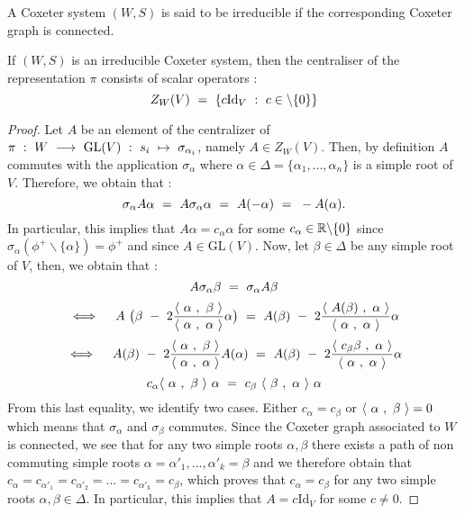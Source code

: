 \begin{definition}
	A Coxeter system $(W,S)$ is said to be irreducible if the corresponding Coxeter graph is connected.
\end{definition}
\begin{lemma}
	If $(W,S)$ is an irreducible Coxeter system, then the centraliser of the representation $\pi$ consists of scalar operators :
	\begin{equation}
	Z_W(V)\text{ }=\text{ }\{c\mbox{Id}_V\text{ }:\text{ } c\in \backslash\{0\}\}
	\end{equation}
\end{lemma}
\begin{proof}
	Let $A$ be an element of the centralizer of $\pi\text{ }:\text{ } W\text{ }\longrightarrow\text{ } \mbox{GL}(V)\text{ } :\text{ } s_i\text{ } \mapsto\text{ } \sigma_{\alpha_i}$, namely $A\in Z_W(V)$. Then, by definition $A$ commutes with the application $\sigma_\alpha$ where $\alpha\in \Delta=\{\alpha_1,...,\alpha_n\}$ is a simple root of $V$. Therefore, we obtain that :
	\begin{equation}
	\sigma_\alpha A\alpha\text{ }=\text{ } A\sigma_\alpha\alpha\text{ }=\text{ } A(-\alpha) \text{ }=\text{ } -A(\alpha).
	\end{equation}
	In particular, this implies that $A\alpha=c_\alpha\alpha$ for some $c_\alpha\in \mathbb R\backslash\{0\}$ since $\sigma_\alpha(\phi^+\backslash\{\alpha\})=\phi^+$ and since $A\in \mbox{GL}(V)$. Now, let $\beta\in\Delta$ be any simple root of $V$, then, we obtain that :
	\begin{equation*}
	A\sigma_\alpha\beta\text{ }=\text{ } \sigma_\alpha A\beta
	\end{equation*}
	\begin{equation*}
	\iff \quad A\text{ } \big(\beta\text{ }-\text{ } 2\frac{\langle\text{ } \alpha\text{ },\text{ }\beta\text{ }\rangle}{\langle\text{ } \alpha\text{ },\text{ }\alpha\text{ }\rangle}\alpha\big)\text{ }=\text{ } A(\beta)\text{ } -\text{ } 2\frac{\langle\text{ } A(\beta)\text{ },\text{ }\alpha\text{ }\rangle}{\langle\text{ } \alpha\text{ },\text{ }\alpha\text{ }\rangle}\alpha
	\end{equation*}
	\begin{equation*}
	\iff \quad A(\beta)\text{ }-\text{ } 2\frac{\langle\text{ } \alpha\text{ },\text{ }\beta\text{ }\rangle}{\langle\text{ } \alpha\text{ },\text{ }\alpha\text{ }\rangle}A(\alpha)\text{ }=\text{ } A(\beta)\text{ } -\text{ } 2\frac{\langle\text{ } c_\beta\beta\text{ },\text{ }\alpha\text{ }\rangle}{\langle\text{ } \alpha\text{ },\text{ }\alpha\text{ }\rangle}\alpha
	\end{equation*}
	\begin{equation*}
	c_\alpha\langle\text{ } \alpha\text{ },\text{ }\beta\text{ }\rangle\text{ }\alpha \text{ } =\text{ } c_\beta\text{ } \langle\text{ } \beta\text{ },\text{ }\alpha\text{ }\rangle\text{ } \alpha
	\end{equation*}
	From this last equality, we identify two cases. Either $c_\alpha=c_\beta$ or $\langle\text{ } \alpha\text{ },\text{ }\beta\text{ }\rangle=0$ which means that $\sigma_\alpha$ and $\sigma_\beta$ commutes. Since the Coxeter graph associated to $W$ is connected, we see that for any two simple roots $\alpha,\beta$ there exists a path of non commuting simple roots $\alpha=\alpha'_1,...,\alpha'_k=\beta$ and we therefore obtain that $c_\alpha=c_{\alpha'_1}=c_{\alpha'_2}=...=c_{\alpha'_k}=c_\beta$, which proves that $c_\alpha=c_\beta$ for any two simple roots $\alpha,\beta\in \Delta$. In particular, this implies that $A=c\mbox{Id}_V$ for some $c\not=0$.
\end{proof}

